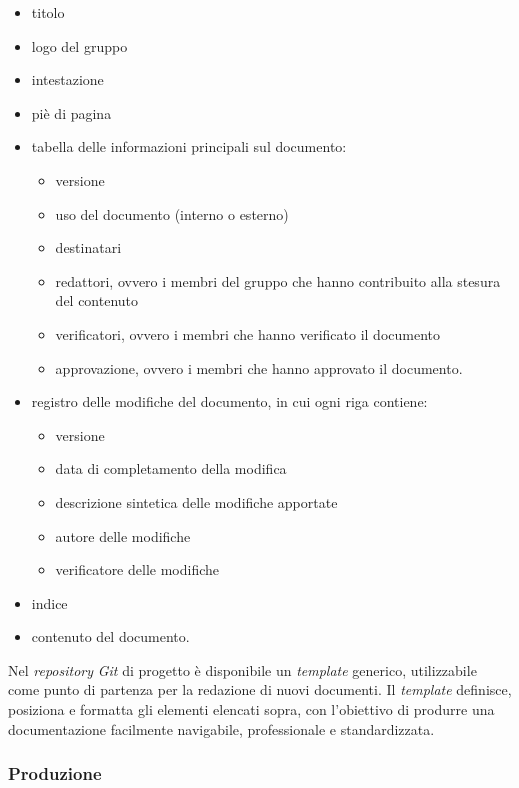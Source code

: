 \documentclass[12pt, a4paper]{article}
\begin{document}
\begin{itemize}
    \item titolo
    \item logo del gruppo
    \item intestazione
    \item piè di pagina

    \item tabella delle informazioni principali sul documento:
    \begin{itemize}
        \item versione
        \item uso del documento (interno o esterno)
        \item destinatari
        \item redattori, ovvero i membri del gruppo che hanno contribuito alla stesura del contenuto
        \item verificatori, ovvero i membri che hanno verificato il documento
        \item approvazione, ovvero i membri che hanno approvato il documento.
    \end{itemize}

    \item registro delle modifiche del documento, in cui ogni riga contiene:
    \begin{itemize}
        \item versione
        \item data di completamento della modifica
        \item descrizione sintetica delle modifiche apportate
        \item autore delle modifiche
        \item verificatore delle modifiche
    \end{itemize}

    \item indice
    \item contenuto del documento.
\end{itemize}

Nel \textit{repository} \textit{Git} di progetto è disponibile un \textit{template} generico, utilizzabile come punto di partenza per la redazione di nuovi documenti. Il \textit{template} definisce, posiziona e formatta gli elementi elencati sopra, con l'obiettivo di produrre una documentazione facilmente navigabile, professionale e standardizzata.

\subsubsection{Produzione}
\end{document}
